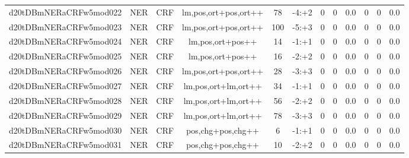 \documentclass[a4paper]{article}
\begin{document}
\begin{landscape}
\begin{center}
\begin{tabular}{ |c|c|c|c|c|c|c|c|c|c|c|c|}
 
 	
 	\small{ d20tDBmNERaCRFw5mod022 } & \small{ NER} & \small{  CRF }  & lm,pos,ort+pos,ort++  &  78 &  \small{  -4:+2 }  &  0 & 0 & 0.0  &  0 & 0 & 0.0 \\
 	

 
 	
 	\small{ d20tDBmNERaCRFw5mod023 } & \small{ NER} & \small{  CRF }  & lm,pos,ort+pos,ort++  &  100 &  \small{  -5:+3 }  &  0 & 0 & 0.0  &  0 & 0 & 0.0 \\
 	

 
 	
 	\small{ d20tDBmNERaCRFw5mod024 } & \small{ NER} & \small{  CRF }  & lm,pos,ort+pos++  &  14 &  \small{  -1:+1 }  &  0 & 0 & 0.0  &  0 & 0 & 0.0 \\
 	

 
 	
 	\small{ d20tDBmNERaCRFw5mod025 } & \small{ NER} & \small{  CRF }  & lm,pos,ort+pos++  &  16 &  \small{  -2:+2 }  &  0 & 0 & 0.0  &  0 & 0 & 0.0 \\
 	

 
 	
 	\small{ d20tDBmNERaCRFw5mod026 } & \small{ NER} & \small{  CRF }  & lm,pos,ort+pos,ort++  &  28 &  \small{  -3:+3 }  &  0 & 0 & 0.0  &  0 & 0 & 0.0 \\
 	

 
 	
 	\small{ d20tDBmNERaCRFw5mod027 } & \small{ NER} & \small{  CRF }  & lm,pos,ort+lm,ort++  &  34 &  \small{  -1:+1 }  &  0 & 0 & 0.0  &  0 & 0 & 0.0 \\
 	

 
 	
 	\small{ d20tDBmNERaCRFw5mod028 } & \small{ NER} & \small{  CRF }  & lm,pos,ort+lm,ort++  &  56 &  \small{  -2:+2 }  &  0 & 0 & 0.0  &  0 & 0 & 0.0 \\
 	

 
 	
 	\small{ d20tDBmNERaCRFw5mod029 } & \small{ NER} & \small{  CRF }  & lm,pos,ort+lm,ort++  &  78 &  \small{  -3:+3 }  &  0 & 0 & 0.0  &  0 & 0 & 0.0 \\
 	

 
 	
 	\small{ d20tDBmNERaCRFw5mod030 } & \small{ NER} & \small{  CRF }  & pos,chg+pos,chg++  &  6 &  \small{  -1:+1 }  &  0 & 0 & 0.0  &  0 & 0 & 0.0 \\
 	

 
 	
 	\small{ d20tDBmNERaCRFw5mod031 } & \small{ NER} & \small{  CRF }  & pos,chg+pos,chg++  &  10 &  \small{  -2:+2 }  &  0 & 0 & 0.0  &  0 & 0 & 0.0 \\
 	


\end{tabular}
\end{center}
\end{landscape}
\end{document}
